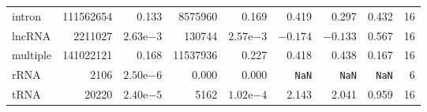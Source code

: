 \begin{table}
\begin{tabular}{lrrrrrrrr}
        intron     & \num{111562654} & 0.133                & \num{8575960}  & 0.169                & 0.419        & 0.297        & 0.432        & 16 \\
        lncRNA     & \num{2211027}   & $2.63\mathrm{e}{-3}$ & \num{130744}   & $2.57\mathrm{e}{-3}$ & $-0.174$     & $-0.133$     & 0.567        & 16 \\
        multiple   & \num{141022121} & 0.168                & \num{11537936} & 0.227                & 0.418        & 0.438        & 0.167        & 16 \\
        rRNA       & \num{2106}      & $2.50\mathrm{e}{-6}$ & 0.000          & 0.000                & \texttt{NaN} & \texttt{NaN} & \texttt{NaN} & 6 \\
        tRNA       & \num{20220}     & $2.40\mathrm{e}{-5}$ & \num{5162}     & $1.02\mathrm{e}{-4}$ & 2.143        & 2.041        & 0.959        & 16 \\
   \bottomrule
\end{tabular}
\end{table}


